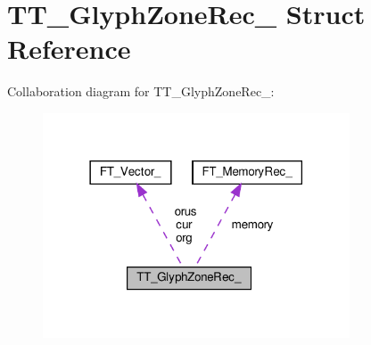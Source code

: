 \hypertarget{structTT__GlyphZoneRec__}{}\section{T\+T\+\_\+\+Glyph\+Zone\+Rec\+\_\+ Struct Reference}
\label{structTT__GlyphZoneRec__}


Collaboration diagram for T\+T\+\_\+\+Glyph\+Zone\+Rec\+\_\+\+:
\nopagebreak
\begin{figure}[H]
\begin{center}
\leavevmode
\includegraphics[width=258pt]{structTT__GlyphZoneRec____coll__graph}
\end{center}
\end{figure}
